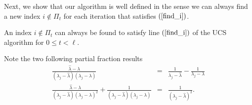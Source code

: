 \documentclass[final,leqno,onefignum,onetabnum]{siamltex1213}
\begin{document}
Next, we show that our algorithm is well defined in the sense we can always find a new index $i\notin \Pi_t$ for each iteration that
satisfies $(\ref{find_i})$.
\begin{lemma}\label{lemma:2}
An index $i\notin \Pi_t$ can always be found to satisfy line
$(\ref{find_i})$ of the UCS algorithm for $0\leq t
<\ell$.
\end{lemma}
\proof Note the two following partial fraction results
\begin{eqnarray}
{\displaystyle \frac{\widehat{\lambda}-\lambda}{\left(\lambda_j-\widehat{\lambda}\right)\left(\lambda_j-\lambda\right)}}&=&{\displaystyle \frac{1}{\lambda_j-\widehat{\lambda}}-\frac{1}{\lambda_j-\lambda} }\label{eqn1} \\
{\displaystyle \frac{\widehat{\lambda}-\lambda}{\left(\lambda_j-\widehat{\lambda}\right)\left(\lambda_j-\lambda\right)^2}+\frac{1}{\left(\lambda_j-\widehat{\lambda}\right)\left(\lambda_j-\lambda\right)}}&=&{\displaystyle \frac{1}{\left(\lambda_j-\widehat{\lambda}\right)^2}.} \label{eqn2}
\end{eqnarray}
\end{document}
